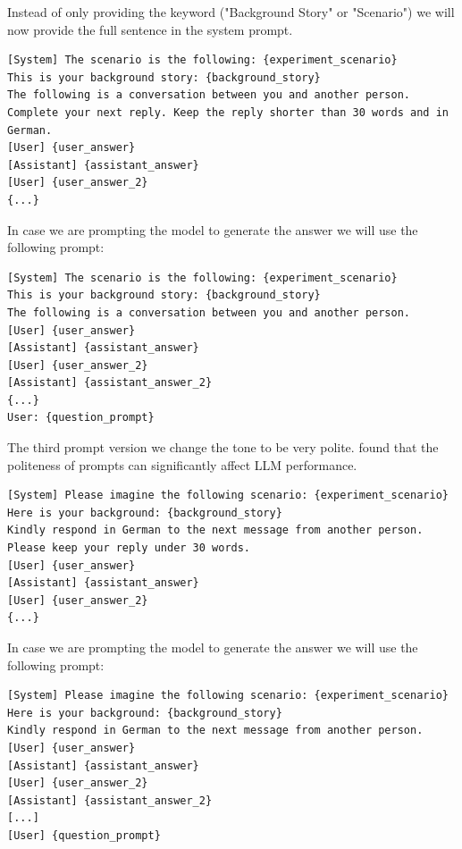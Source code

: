 \documentclass[12pt]{article}
\begin{document}
Instead of only providing the keyword ("Background Story" or "Scenario") we will now provide the full sentence in the system prompt. 


\begin{lstlisting}[caption={Prompt 2 - Discussion Prompt}]
[System] The scenario is the following: {experiment_scenario}
This is your background story: {background_story}
The following is a conversation between you and another person. Complete your next reply. Keep the reply shorter than 30 words and in German.
[User] {user_answer}
[Assistant] {assistant_answer}
[User] {user_answer_2}
{...}
\end{lstlisting}
In case we are prompting the model to generate the answer we will use the following prompt:
\begin{lstlisting}[caption={Prompt 2 - Answer Generation}]
[System] The scenario is the following: {experiment_scenario}
This is your background story: {background_story}
The following is a conversation between you and another person.
[User] {user_answer}
[Assistant] {assistant_answer}  
[User] {user_answer_2}
[Assistant] {assistant_answer_2}
{...}    
User: {question_prompt} 
\end{lstlisting}




The third prompt version we change the tone to be very polite.  found that the politeness of prompts can significantly affect LLM performance. 

\begin{lstlisting}[caption={Prompt 3 - Discussion Prompt}]
[System] Please imagine the following scenario: {experiment_scenario}  
Here is your background: {background_story}  
Kindly respond in German to the next message from another person. Please keep your reply under 30 words.
[User] {user_answer}
[Assistant] {assistant_answer}
[User] {user_answer_2}
{...}
\end{lstlisting}    

In case we are prompting the model to generate the answer we will use the following prompt:
\begin{lstlisting}[caption={Prompt 3 - Answer Generation}]
[System] Please imagine the following scenario: {experiment_scenario}  
Here is your background: {background_story}  
Kindly respond in German to the next message from another person.
[User] {user_answer}
[Assistant] {assistant_answer}
[User] {user_answer_2}
[Assistant] {assistant_answer_2}
[...]
[User] {question_prompt}
\end{lstlisting}
\end{document}
